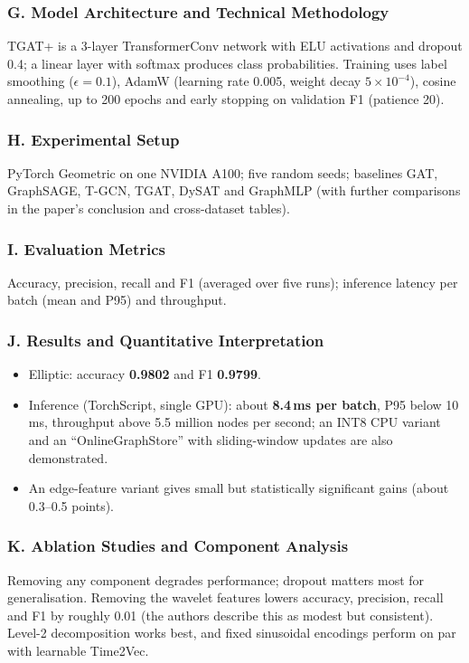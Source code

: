 \documentclass[11pt,a4paper]{article}
\begin{document}
\subsubsection*{G. Model Architecture and Technical Methodology}
TGAT+ is a 3-layer TransformerConv network with ELU activations and dropout 0.4; a linear layer with softmax produces class probabilities. Training uses label smoothing ($\epsilon=0.1$), AdamW (learning rate 0.005, weight decay $5\times10^{-4}$), cosine annealing, up to 200 epochs and early stopping on validation F1 (patience 20).

\subsubsection*{H. Experimental Setup}
PyTorch Geometric on one NVIDIA A100; five random seeds; baselines GAT, GraphSAGE, T-GCN, TGAT, DySAT and GraphMLP (with further comparisons in the paper's conclusion and cross-dataset tables).

\subsubsection*{I. Evaluation Metrics}
Accuracy, precision, recall and F1 (averaged over five runs); inference latency per batch (mean and P95) and throughput.

\subsubsection*{J. Results and Quantitative Interpretation}
\begin{itemize}[leftmargin=*]
    \item Elliptic: accuracy \textbf{0.9802} and F1 \textbf{0.9799}.
    \item Inference (TorchScript, single GPU): about \textbf{8.4\,ms per batch}, P95 below 10\,ms, throughput above 5.5 million nodes per second; an INT8 CPU variant and an ``OnlineGraphStore'' with sliding-window updates are also demonstrated.
    \item An edge-feature variant gives small but statistically significant gains (about 0.3--0.5 points).
\end{itemize}

\subsubsection*{K. Ablation Studies and Component Analysis}
Removing any component degrades performance; dropout matters most for generalisation. Removing the wavelet features lowers accuracy, precision, recall and F1 by roughly 0.01 (the authors describe this as modest but consistent). Level-2 decomposition works best, and fixed sinusoidal encodings perform on par with learnable Time2Vec.
\end{document}
